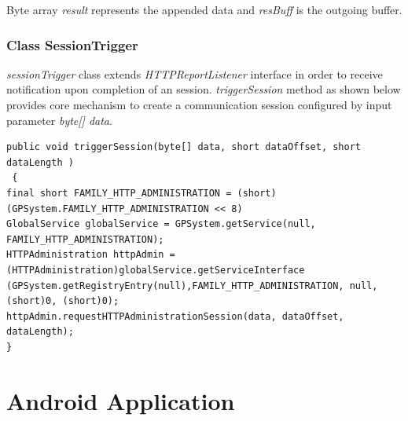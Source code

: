 Byte array \emph{result} represents the appended data and \emph{resBuff} is the outgoing buffer. 

\subsubsection{Class SessionTrigger}
\emph{sessionTrigger} class extends \emph{HTTPReportListener} interface in order to receive notification upon completion of an session.
\emph{triggerSession} method as shown below provides core mechanism to create a communication session configured by input parameter \emph{byte[] data}.
\begin{Verbatim}[fontsize=\relsize{-2}, frame=lines,framesep=4mm, label=\fbox{\small\emph{Trigger Session}}]
public void triggerSession(byte[] data, short dataOffset, short dataLength )
 {
final short FAMILY_HTTP_ADMINISTRATION = (short) (GPSystem.FAMILY_HTTP_ADMINISTRATION << 8)
GlobalService globalService = GPSystem.getService(null, FAMILY_HTTP_ADMINISTRATION);
HTTPAdministration httpAdmin = (HTTPAdministration)globalService.getServiceInterface
(GPSystem.getRegistryEntry(null),FAMILY_HTTP_ADMINISTRATION, null, (short)0, (short)0);
httpAdmin.requestHTTPAdministrationSession(data, dataOffset, dataLength);
}
\end{Verbatim}

\section{Android Application}
